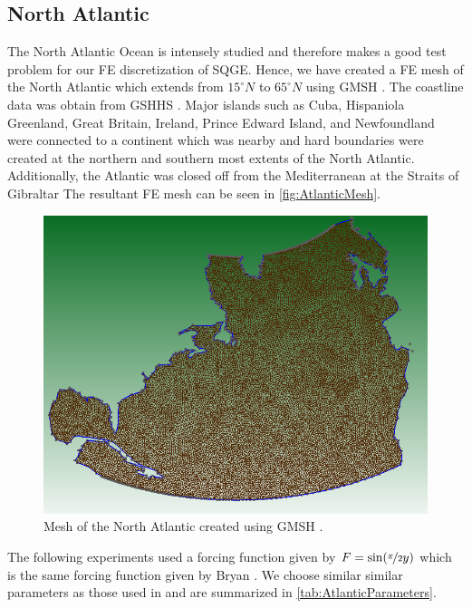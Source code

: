 \subsection{North Atlantic}
The North Atlantic Ocean is intensely studied\cite{Myers} and therefore makes a
good test problem for our FE discretization of SQGE. Hence, we have created a FE
mesh of the North Atlantic which extends from $15^\circ N$ to $65^\circ N$ using
GMSH \cite{GMSH}. The coastline data was obtain from GSHHS \cite{GSHHS}.  Major
islands such as Cuba, Hispaniola Greenland, Great Britain, Ireland, Prince
Edward Island, and Newfoundland were connected to a continent which was nearby
and hard boundaries were created at the northern and southern most extents of
the North Atlantic. Additionally, the Atlantic was closed off from the
Mediterranean at the Straits of Gibraltar The resultant FE mesh can be seen in
\autoref{fig:AtlanticMesh}.

\begin{figure}
  \begin{center}
    \includegraphics[scale=0.75]{Figures/NAMesh.png}
    \caption{Mesh of the North Atlantic created using GMSH \cite{GMSH}.}
    \label{fig:AtlanticMesh}
  \end{center}
\end{figure}

The following experiments used a forcing function given by $F =
\sin(\nicefrac{\pi}{2} y)$ which is the same forcing function given by Bryan
\cite{Bryan1963}. We choose similar similar parameters as those used in
\cite{delSastre04} and are summarized in \autoref{tab:AtlanticParameters}.

